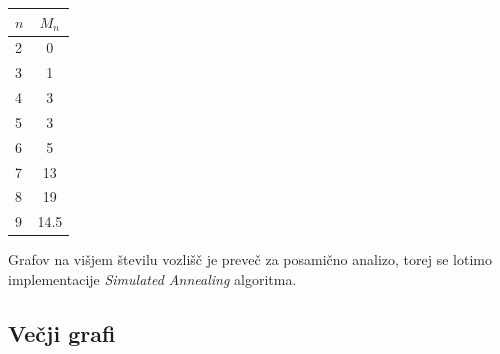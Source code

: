 \documentclass[ letterpaper, titlepage, fleqn]{article}
\begin{document}
\begin{center}
    \begin{tabular}{ l | c }
      $n$ & $M_n$ \\ \hline
      2 & 0 \\ 
      3 & 1 \\ 
      4 & 3 \\ 
      5 & 3 \\ 
      6 & 5 \\ 
      7 & 13 \\ 
      8 & 19 \\ 
      9 & 14.5 \\ 
    \end{tabular}
\end{center}

Grafov na višjem številu vozlišč je preveč za posamično analizo, torej
se lotimo implementacije {\em Simulated Annealing} algoritma.

\subsection{Večji grafi}
\end{document}
